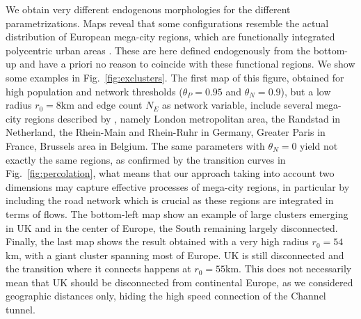 \documentclass{jimis-en}
\begin{document}
We obtain very different endogenous morphologies for the different parametrizations. Maps reveal that some configurations resemble the actual distribution of European mega-city regions, which are functionally integrated polycentric urban areas \citep{hall2006polycentric}. These are here defined endogenously from the bottom-up and have a priori no reason to coincide with these functional regions. We show some examples in Fig.~\ref{fig:exclusters}. The first map of this figure, obtained for high population and network thresholds ($\theta_P = 0.95$ and $\theta_N = 0.9$), but a low radius $r_0 = 8$km and edge count $N_E$ as network variable, include several mega-city regions described by \citep{hall2006polycentric}, namely London metropolitan area, the Randstad in Netherland, the Rhein-Main and Rhein-Ruhr in Germany, Greater Paris in France, Brussels area in Belgium. The same parameters with $\theta_N = 0$ yield not exactly the same regions, as confirmed by the transition curves in Fig.~\ref{fig:percolation}, what means that our approach taking into account two dimensions may capture effective processes of mega-city regions, in particular by including the road network which is crucial as these regions are integrated in terms of flows. The bottom-left map show an example of large clusters emerging in UK and in the center of Europe, the South remaining largely disconnected. Finally, the last map shows the result obtained with a very high radius $r_0 = 54$km, with a giant cluster spanning most of Europe. UK is still disconnected and the transition where it connects happens at $r_0 = 55$km. This does not necessarily mean that UK should be disconnected from continental Europe, as we considered geographic distances only, hiding the high speed connection of the Channel tunnel.
\end{document}
